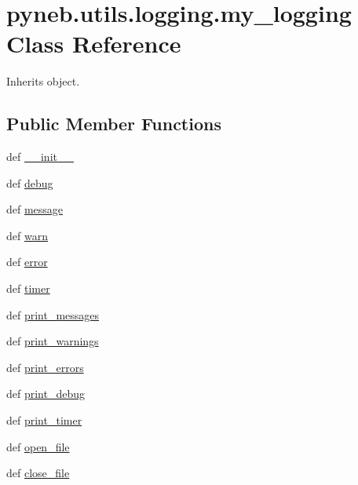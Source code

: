 \hypertarget{classpyneb_1_1utils_1_1logging_1_1my__logging}{\section{pyneb.\-utils.\-logging.\-my\-\_\-logging Class Reference}
\label{classpyneb_1_1utils_1_1logging_1_1my__logging}
}


Inherits object.

\subsection*{Public Member Functions}
\begin{DoxyCompactItemize}
\item 
def \hyperlink{classpyneb_1_1utils_1_1logging_1_1my__logging_a0cc4a77d6e98d36c9534d366349d1f66}{\-\_\-\-\_\-init\-\_\-\-\_\-}
\item 
def \hyperlink{classpyneb_1_1utils_1_1logging_1_1my__logging_ab2479af710eb9d4326680ecd1e1ebdc3}{debug}
\item 
def \hyperlink{classpyneb_1_1utils_1_1logging_1_1my__logging_aa68e779cfc1c812574fb4ddf65041965}{message}
\item 
def \hyperlink{classpyneb_1_1utils_1_1logging_1_1my__logging_aed7bf24f37fee46da46caae857bc383c}{warn}
\item 
def \hyperlink{classpyneb_1_1utils_1_1logging_1_1my__logging_a8d71fe419d7ac8f28ad780518665294b}{error}
\item 
def \hyperlink{classpyneb_1_1utils_1_1logging_1_1my__logging_add0fcb8b9321526315dbf724c9b09064}{timer}
\item 
def \hyperlink{classpyneb_1_1utils_1_1logging_1_1my__logging_af8433258ffe326c051a5e57578b91e1c}{print\-\_\-messages}
\item 
def \hyperlink{classpyneb_1_1utils_1_1logging_1_1my__logging_aaa68f2ac703dbce82d9a3e8b671cb698}{print\-\_\-warnings}
\item 
def \hyperlink{classpyneb_1_1utils_1_1logging_1_1my__logging_a17e5895aa7954aa50487d90af7d321e6}{print\-\_\-errors}
\item 
def \hyperlink{classpyneb_1_1utils_1_1logging_1_1my__logging_a8d8cf8a15c565aa7ea07a2be061362ed}{print\-\_\-debug}
\item 
def \hyperlink{classpyneb_1_1utils_1_1logging_1_1my__logging_a8d4950f52b60afa65db8927d2eff256a}{print\-\_\-timer}
\item 
def \hyperlink{classpyneb_1_1utils_1_1logging_1_1my__logging_ad554f6bcf908bd31a5f2cac7bcff5678}{open\-\_\-file}
\item 
def \hyperlink{classpyneb_1_1utils_1_1logging_1_1my__logging_a32afe13c43c3ffc45466200744fbc89b}{close\-\_\-file}
\end{DoxyCompactItemize}
